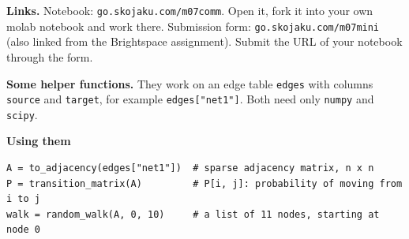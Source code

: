 \documentclass[a4paper, 12pt]{extarticle}
\begin{document}
\textbf{Links.} Notebook: \texttt{go.skojaku.com/m07comm}. Open it, fork it into your
own molab notebook and work there. Submission form: \texttt{go.skojaku.com/m07mini}
(also linked from the Brightspace assignment). Submit the URL of your notebook
through the form.

\newpage

\textbf{Some helper functions.} They work on an edge
table \texttt{edges} with columns \texttt{source} and \texttt{target}, for example
\texttt{edges["net1"]}. Both need only \texttt{numpy} and \texttt{scipy}.



\textbf{Using them}
\begin{lstlisting}
A = to_adjacency(edges["net1"])  # sparse adjacency matrix, n x n
P = transition_matrix(A)         # P[i, j]: probability of moving from i to j
walk = random_walk(A, 0, 10)     # a list of 11 nodes, starting at node 0
\end{lstlisting}
\end{document}

